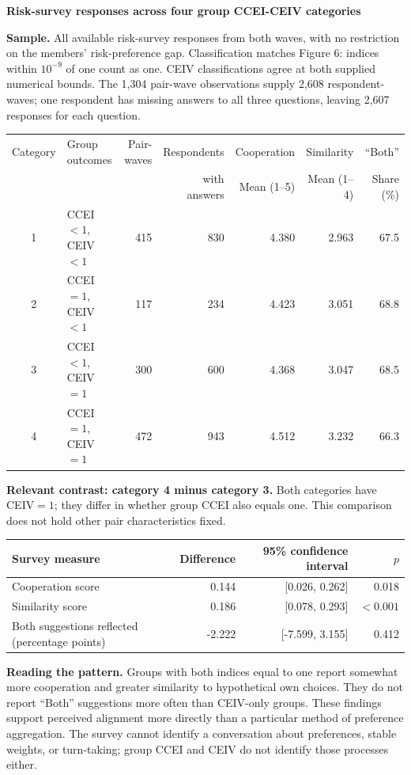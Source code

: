 \documentclass[11pt]{article}
\begin{document}
\begin{center}\Large\textbf{Risk-survey responses across four group CCEI-CEIV categories}\end{center}
\textbf{Sample.} All available risk-survey responses from both waves, with no restriction on the members' risk-preference
gap. Classification matches Figure 6: indices within $10^{-9}$ of one count as one. CEIV classifications agree at both
supplied numerical bounds. The 1,304 pair-wave observations supply 2,608 respondent-waves; one respondent has missing
answers to all three questions, leaving 2,607 responses for each question.

\begin{center}\small\begin{tabular}{clrrrrr}\toprule
Category & Group outcomes & Pair-waves & Respondents & Cooperation & Similarity & ``Both''\\
& & & with answers & Mean (1--5) & Mean (1--4) & Share (\%)\\\midrule
1 & CCEI$<1$, CEIV$<1$ & 415 & 830 & 4.380 & 2.963 & 67.5\\
2 & CCEI$=1$, CEIV$<1$ & 117 & 234 & 4.423 & 3.051 & 68.8\\
3 & CCEI$<1$, CEIV$=1$ & 300 & 600 & 4.368 & 3.047 & 68.5\\
4 & CCEI$=1$, CEIV$=1$ & 472 & 943 & 4.512 & 3.232 & 66.3\\
\bottomrule\end{tabular}\end{center}
\textbf{Relevant contrast: category 4 minus category 3.} Both categories have CEIV$=1$;
they differ in whether group CCEI also equals one. This comparison does not hold other pair characteristics fixed.
\begin{center}\small
\begin{tabular}{lrrr}\toprule
Survey measure & Difference & 95\% confidence interval & $p$\\\midrule
Cooperation score & 0.144 & [0.026, 0.262] & 0.018\\
Similarity score & 0.186 & [0.078, 0.293] & $<0.001$\\
Both suggestions reflected (percentage points) & -2.222 & [-7.599, 3.155] & 0.412\\
\bottomrule\end{tabular}\end{center}

\small
\textbf{Reading the pattern.} Groups with both indices equal to one report somewhat more cooperation and greater
similarity to hypothetical own choices. They do not report ``Both'' suggestions more often than CEIV-only groups.
These findings support perceived alignment more directly than a particular method of preference aggregation.
The survey cannot identify a conversation about preferences, stable weights, or turn-taking; group CCEI and CEIV do
not identify those processes either.
\end{document}

